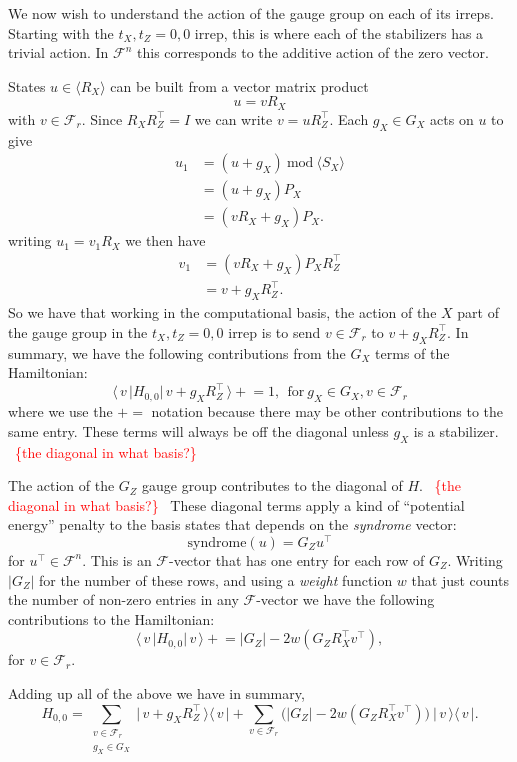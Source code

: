 \documentclass[11pt,oneside]{article}
\newcommand{\todo}[1]{\ \textcolor{red}{\{#1\}}\ }
\newcommand{\bket}[1]{\bigl|\,{#1}\,\bigr\rangle}
\newcommand{\bbra}[1]{\bigl\langle\,{#1}\,\bigr|}
\def\Span#1{\langle #1 \rangle}
\newcommand{\Field}{\mathcal{F}}
\def\Fn{\Field^n}
\def\Frd{\Field_{r}}
\begin{document}
We now wish to understand the action of the
gauge group on each of its irreps.
Starting with the $t_X,t_Z=0,0$ irrep,
this is where each of the stabilizers has
a trivial action. 
In $\Fn$ this
corresponds to the additive action of the zero vector.

\newcommand{\pluseq}{\mathrel{+}=}
States $u\in\Span{R_X}$ can be built from a
vector matrix product
$$
    u = v R_X
$$
with $v\in\Frd.$
Since $R_X R_Z^\top = I$
we can write $v = u R_Z^\top.$
Each $g_X\in G_X$ acts on $u$ to give
\begin{align*}
    u_1 &= (u + g_X) \ \mbox{mod}\ \Span{S_X} \\
        &= (u + g_X) P_X \\
        &= (v R_X + g_X) P_X.
\end{align*}
writing $u_1 = v_1 R_X$ we then have
\begin{align*}
    v_1 &= (v R_X + g_X) P_X R_Z^\top \\
        &= v + g_X R_Z^\top.
\end{align*}
So we have that working in the computational
basis, the action of the $X$ part of the
gauge group in the $t_X,t_Z=0,0$ irrep is to send
$v\in \Frd$ to $v + g_X R_Z^\top.$
In summary, we have the following contributions from the
$G_X$ terms of the Hamiltonian:
$$
    \bbra{v} H_{0,0} \bket{v+g_X  R_Z^\top} 
        \pluseq 1,\ \ \mbox{for}\ g_X\in G_X, v\in \Frd
$$
where we use the $\pluseq$ notation
because there may be other contributions to the
same entry.
These terms will always be off
the diagonal unless $g_X$ is a stabilizer. \todo{the diagonal in what basis?}

The action of the $G_Z$ gauge group
contributes to the diagonal of $H.$ \todo{the diagonal in what basis?}
These diagonal terms apply a kind of
``potential energy'' penalty
to the basis states
that depends on the \emph{syndrome} vector:
$$
    \mbox{syndrome}(u) = G_Z u^\top
$$
for $u^\top \in \Fn.$
This is an $\Field$-vector that has one entry for
each row of $G_Z.$
Writing $|G_Z|$ for the number of these rows, and 
using a \emph{weight} function $w$ that just counts
the number of non-zero entries in any $\Field$-vector
we have the following contributions to
the Hamiltonian:
$$
    \bbra{v} H_{0,0} \bket{v} 
        \pluseq |G_Z| - 2w(G_Z R_X^\top v^\top),
$$
for $v\in \Frd.$

Adding up all of the above we
have in summary,
\begin{equation}\label{hamblockgs}
H_{0,0} = \sum_{\substack{v\in\Frd\\g_X\in G_X } }
  \bket{v+g_X  R_Z^\top}\bbra{v} 
  + \sum_{v\in\Frd} \bigl(|G_Z| - 2w(G_Z R_X^\top v^\top)
    \bigr) \ \bket{v}\bbra{v}.
\end{equation}
\end{document}
